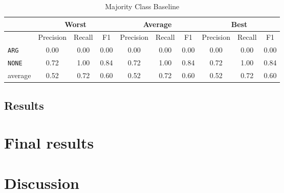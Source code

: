  \begin{table}[h]
                \centering
\caption{Majority Class Baseline}
\label{tbl:bin_maj}
 \begin{tabular}{@{}lccccccccc@{}}
              \toprule
               & \multicolumn{3}{c}{Worst} & \multicolumn{3}{c}{Average} & \multicolumn{3}{c}{Best}  \\ \midrule
               & Precision  & Recall & F1   & Precision  & Recall  & F1    & Precision & Recall & F1   \\ \toprule
\texttt{ARG}	 & 0.00	 & 0.00	 & 0.00	 &0.00	 & 0.00	 & 0.00	 &0.00	 & 0.00	 & 0.00	 \\ 
\texttt{NONE}	 & 0.72	 & 1.00	 & 0.84	 &0.72	 & 1.00	 & 0.84	 &0.72	 & 1.00	 & 0.84	 \\ \midrule 
average	 & 0.52	 & 0.72	 & 0.60	 &0.52	 & 0.72	 & 0.60	 &0.52	 & 0.72	 & 0.60	 \\ \bottomrule

    \end{tabular}
\end{table}

\subsection{Results}

\section{Final results}
\label{sec:final}

\section{Discussion}